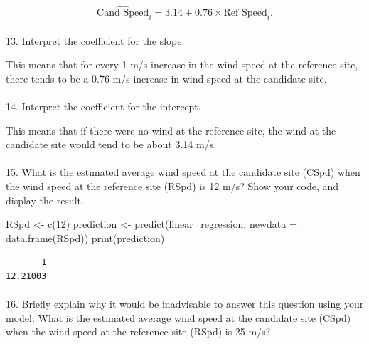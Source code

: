 \documentclass[
  letterpaper,
  DIV=11,
  numbers=noendperiod]{scrartcl}
\makeatletter
\let\oldparagraph\paragraph
\renewcommand{\paragraph}{
    \@ifstar
      \xxxParagraphStar
      \xxxParagraphNoStar
  }
\newcommand{\xxxParagraphStar}[1]{\oldparagraph*{#1}\mbox{}}
\newcommand{\xxxParagraphNoStar}[1]{\oldparagraph{#1}\mbox{}}
\newenvironment{Shaded}{\begin{snugshade}}{\end{snugshade}}
\newcommand{\AttributeTok}[1]{\textcolor[rgb]{0.40,0.45,0.13}{#1}}
\newcommand{\DecValTok}[1]{\textcolor[rgb]{0.68,0.00,0.00}{#1}}
\newcommand{\FunctionTok}[1]{\textcolor[rgb]{0.28,0.35,0.67}{#1}}
\newcommand{\NormalTok}[1]{\textcolor[rgb]{0.00,0.23,0.31}{#1}}
\newcommand{\OtherTok}[1]{\textcolor[rgb]{0.00,0.23,0.31}{#1}}
\makeatother
\begin{document}
\[\widehat{\text{Cand Speed}}_i = 3.14 + 0.76 \times \text{Ref Speed}_i.\]

\paragraph{13. Interpret the coefficient for the
slope.}\label{interpret-the-coefficient-for-the-slope.}

This means that for every 1 m/s increase in the wind speed at the
reference site, there tends to be a 0.76 m/s increase in wind speed at
the candidate site.

\paragraph{14. Interpret the coefficient for the
intercept.}\label{interpret-the-coefficient-for-the-intercept.}

This means that if there were no wind at the reference site, the wind at
the candidate site would tend to be about 3.14 m/s.

\paragraph{15. What is the estimated average wind speed at the candidate
site (CSpd) when the wind speed at the reference site (RSpd) is 12 m/s?
Show your code, and display the
result.}\label{what-is-the-estimated-average-wind-speed-at-the-candidate-site-cspd-when-the-wind-speed-at-the-reference-site-rspd-is-12-ms-show-your-code-and-display-the-result.}

\begin{Shaded}
\begin{Highlighting}[]
\NormalTok{RSpd }\OtherTok{\textless{}{-}} \FunctionTok{c}\NormalTok{(}\DecValTok{12}\NormalTok{)}
\NormalTok{prediction }\OtherTok{\textless{}{-}} \FunctionTok{predict}\NormalTok{(linear\_regression, }\AttributeTok{newdata =} \FunctionTok{data.frame}\NormalTok{(RSpd))}
\FunctionTok{print}\NormalTok{(prediction)}
\end{Highlighting}
\end{Shaded}

\begin{verbatim}
       1 
12.21003 
\end{verbatim}

\paragraph{16. Briefly explain why it would be inadvisable to answer
this question using your model: What is the estimated average wind speed
at the candidate site (CSpd) when the wind speed at the reference site
(RSpd) is 25
m/s?}\label{briefly-explain-why-it-would-be-inadvisable-to-answer-this-question-using-your-model-what-is-the-estimated-average-wind-speed-at-the-candidate-site-cspd-when-the-wind-speed-at-the-reference-site-rspd-is-25-ms}
\end{document}
